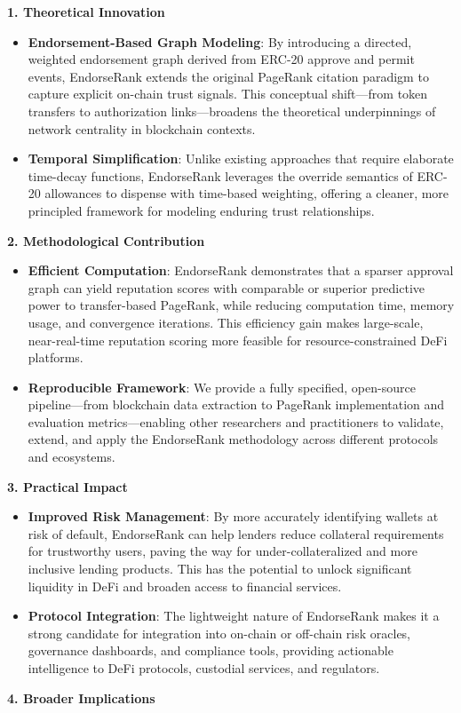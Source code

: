 \documentclass[12pt]{article}
\newcommand{\proposalSubheading}[1]{%
  \par\addvspace{0.38\baselineskip}%
  \noindent\textbf{#1}\par\nobreak\addvspace{0.08\baselineskip}%
}
\begin{document}
\proposalSubheading{1. Theoretical Innovation}

\begin{itemize}
\item[\textbullet] \textbf{Endorsement-Based Graph Modeling}: By introducing a directed, weighted endorsement graph derived from ERC-20 approve and permit events, EndorseRank extends the original PageRank citation paradigm to capture explicit on-chain trust signals. This conceptual shift---from token transfers to authorization links---broadens the theoretical underpinnings of network centrality in blockchain contexts.
\item[\textbullet] \textbf{Temporal Simplification}: Unlike existing approaches that require elaborate time-decay functions, EndorseRank leverages the override semantics of ERC-20 allowances to dispense with time-based weighting, offering a cleaner, more principled framework for modeling enduring trust relationships.
\end{itemize}
\proposalSubheading{2. Methodological Contribution}

\begin{itemize}
\item[\textbullet] \textbf{Efficient Computation}: EndorseRank demonstrates that a sparser approval graph can yield reputation scores with comparable or superior predictive power to transfer-based PageRank, while reducing computation time, memory usage, and convergence iterations. This efficiency gain makes large-scale, near-real-time reputation scoring more feasible for resource-constrained DeFi platforms.
\item[\textbullet] \textbf{Reproducible Framework}: We provide a fully specified, open-source pipeline---from blockchain data extraction to PageRank implementation and evaluation metrics---enabling other researchers and practitioners to validate, extend, and apply the EndorseRank methodology across different protocols and ecosystems.
\end{itemize}
\proposalSubheading{3. Practical Impact}

\begin{itemize}
\item[\textbullet] \textbf{Improved Risk Management}: By more accurately identifying wallets at risk of default, EndorseRank can help lenders reduce collateral requirements for trustworthy users, paving the way for under-collateralized and more inclusive lending products. This has the potential to unlock significant liquidity in DeFi and broaden access to financial services.
\item[\textbullet] \textbf{Protocol Integration}: The lightweight nature of EndorseRank makes it a strong candidate for integration into on-chain or off-chain risk oracles, governance dashboards, and compliance tools, providing actionable intelligence to DeFi protocols, custodial services, and regulators.
\end{itemize}
\proposalSubheading{4. Broader Implications}
\end{document}
